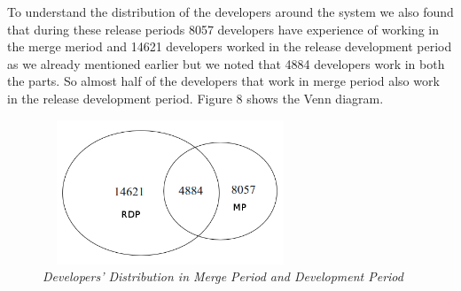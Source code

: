 \documentclass{acm_proc_article-sp}
\begin{document}
To understand the distribution of the developers around the system we also found that during these release periods 8057 developers have experience of working in the merge meriod and 14621 developers worked in the release development period as we already mentioned earlier but we noted that 4884 developers work in both the parts. So almost half of the developers that work in merge period also work in the release development period. Figure 8 shows the Venn diagram.
\begin{figure}
\begin{center}
\includegraphics[height=1.7in,width=3in]{devDistMPRDP.png}
\caption{\small \sl Developers' Distribution in Merge Period and Development Period}
\end{center}
\end{figure}
\end{document}
